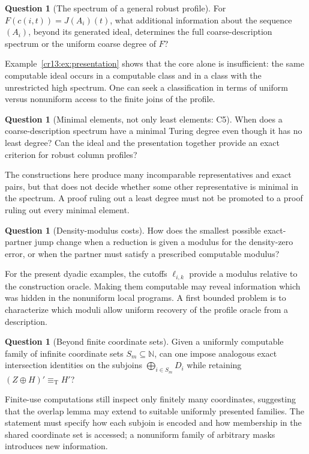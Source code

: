 \documentclass[11pt,letterpaper]{article}
\theoremstyle{definition}
\newtheorem{question}[theorem]{Question}
\theoremstyle{remark}\newtheorem{remark}[theorem]{Remark}
\numberwithin{equation}{section}
\newcommand{\N}{\mathbb N}
\newcommand{\eqT}{\equiv_{\mathrm T}}
\begin{document}
\begin{question}[The spectrum of a general robust profile]\label{cr13:q:profilespectrum}
For $F(c(i,t))=J(A_i)(t)$, what additional information about the sequence $(A_i)$, beyond its generated ideal, determines the full coarse-description spectrum or the uniform coarse degree of $F$?
\end{question}
Example~\ref{cr13:ex:presentation} shows that the core alone is insufficient: the same computable ideal occurs in a computable class and in a class with the unrestricted high spectrum. One can seek a classification in terms of uniform versus nonuniform access to the finite joins of the profile.

\begin{question}[Minimal elements, not only least elements: C5]\label{cr13:q:minimal}
When does a coarse-description spectrum have a minimal Turing degree even though it has no least degree? Can the ideal and the presentation together provide an exact criterion for robust column profiles?
\end{question}
The constructions here produce many incomparable representatives and exact pairs, but that does not decide whether some other representative is minimal in the spectrum. A proof ruling out a least degree must not be promoted to a proof ruling out every minimal element.

\begin{question}[Density-modulus costs]
How does the smallest possible exact-partner jump change when a reduction is given a modulus for the density-zero error, or when the partner must satisfy a prescribed computable modulus?
\end{question}
For the present dyadic examples, the cutoffs $\ell_{i,k}$ provide a modulus relative to the construction oracle. Making them computable may reveal information which was hidden in the nonuniform local programs. A first bounded problem is to characterize which moduli allow uniform recovery of the profile oracle from a description.

\begin{question}[Beyond finite coordinate sets]
Given a uniformly computable family of infinite coordinate sets $S_m\subseteq\N$, can one impose analogous exact intersection identities on the subjoins $\bigoplus_{i\in S_m}D_i$ while retaining $(Z\oplus H)'\eqT H'$?
\end{question}
Finite-use computations still inspect only finitely many coordinates, suggesting that the overlap lemma may extend to suitable uniformly presented families. The statement must specify how each subjoin is encoded and how membership in the shared coordinate set is accessed; a nonuniform family of arbitrary masks introduces new information.
\end{document}

